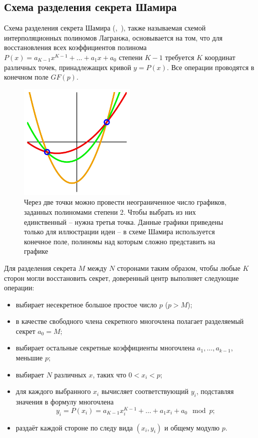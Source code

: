 \subsection[Схема Шамира]{Схема разделения секрета Шамира}

Схема разделения секрета Шамира (,~\cite{Shamir:1979}), также называемая схемой интерполяционных полиномов Лагранжа, основывается на том, что для восстановления всех коэффициентов полинома $P(x) = a_{K-1}x^{K-1} + \dots + a_1 x + a_0$ степени $K-1$ требуется $K$ координат различных точек, принадлежащих кривой $y=P(x)$. Все операции проводятся в конечном поле $GF(p)$.

\begin{figure}[thb]
	\centering
	\includegraphics[width=0.5\textwidth]{pic/shamir}
  \caption{Через две точки можно провести неограниченное число графиков, заданных полиномами степени 2. Чтобы выбрать из них единственный -- нужна третья точка. Данные графики приведены только для иллюстрации идеи -- в схеме Шамира используется конечное поле, полиномы над которым сложно представить на графике}
  \label{fig:shamir}
\end{figure}

Для разделения секрета $M$ между $N$ сторонами таким образом, чтобы любые $K$ сторон могли восстановить секрет, доверенный центр выполняет следующие операции:
\begin{itemize}
	\item выбирает несекретное большое простое число $p$ ($p > M$);
	\item в качестве свободного члена секретного многочлена полагает разделяемый секрет $a_0 = M$;
	\item выбирает остальные секретные коэффициенты многочлена $a_1, \dots, a_{k-1}$, меньшие $p$;
	\item выбирает $N$ различных $x$, таких что $0 < x_i < p$;
	\item для каждого выбранного $x_i$ вычисляет соответствующий $y_i$, подставляя значения в формулу многочлена
		\[ y_i = P( x_i ) = a_{K-1}x_i^{K-1} + \dots + a_1 x_i + a_0 \mod p ;\]
	\item раздаёт каждой стороне по следу вида $(x_i, y_i)$ и общему модулю $p$.
\end{itemize}

